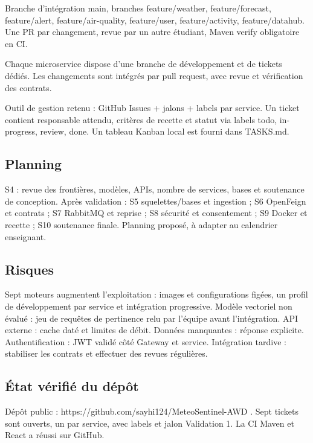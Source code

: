 \documentclass[10pt,a4paper]{article}
\begin{document}
Branche d'intégration main, branches feature/weather, feature/forecast, feature/alert, feature/air-quality, feature/user, feature/activity, feature/datahub. Une PR par changement, revue par un autre étudiant, Maven verify obligatoire en CI.\par

Chaque microservice dispose d'une branche de développement et de tickets dédiés. Les changements sont intégrés par pull request, avec revue et vérification des contrats.\par

Outil de gestion retenu : GitHub Issues + jalons + labels par service. Un ticket contient responsable attendu, critères de recette et statut via labels todo, in-progress, review, done. Un tableau Kanban local est fourni dans TASKS.md.\par

\subsection*{Planning}

S4 : revue des frontières, modèles, APIs, nombre de services, bases et soutenance de conception. Après validation : S5 squelettes/bases et ingestion ; S6 OpenFeign et contrats ; S7 RabbitMQ et reprise ; S8 sécurité et consentement ; S9 Docker et recette ; S10 soutenance finale. Planning proposé, à adapter au calendrier enseignant.\par

\subsection*{Risques}

Sept moteurs augmentent l'exploitation : images et configurations figées, un profil de développement par service et intégration progressive. Modèle vectoriel non évalué : jeu de requêtes de pertinence relu par l'équipe avant l'intégration. API externe : cache daté et limites de débit. Données manquantes : réponse explicite. Authentification : JWT validé côté Gateway et service. Intégration tardive : stabiliser les contrats et effectuer des revues régulières.\par

\subsection*{État vérifié du dépôt}

Dépôt public : https://github.com/sayhi124/MeteoSentinel-AWD . Sept tickets sont ouverts, un par service, avec labels et jalon Validation 1. La CI Maven et React a réussi sur GitHub.\par
\end{document}
